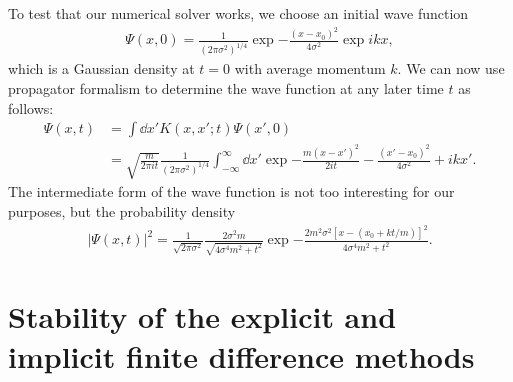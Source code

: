 To test that our numerical solver works, we choose an initial wave function
\begin{align}
    \Psi(x,0) = \frac{1}{(2 \pi \sigma^2)^{1/4}} \exp{-\frac{(x - x_{0})^2}{4 \sigma^2}} \exp{i k x}
,\end{align}
which is a Gaussian density at $t = 0$ with average momentum $k$.
We can now use propagator formalism to determine the wave function at any later time $t$ as follows:
\begin{align}
    \Psi(x,t) &= \int \dd{x'} K(x,x';t) \Psi(x',0) \nonumber \\
              &= \sqrt{\frac{m}{2 \pi i t}} \frac{1}{(2 \pi \sigma^2)^{1/4}} \int_{-\infty}^{\infty} \dd{x'} \exp{-\frac{m(x - x')^2}{2 i t} - \frac{(x' - x_0)^2}{4 \sigma^2} + i k x'}
.\end{align}
The intermediate form of the wave function is not too interesting for our purposes, but the probability density
\begin{align}
    |\Psi(x,t)|^2 = \frac{1}{\sqrt{2 \pi \sigma^2}} \frac{2 \sigma^2 m}{\sqrt{ 4 \sigma^4 m^2 + t^2 }} \exp{ -\frac{2 m^2 \sigma^2 [ x - (x_0 + k t / m) ]^2}{4 \sigma^{4} m^2 + t^2} }
.\end{align}

\appendix

\section{Stability of the explicit and implicit finite difference methods}
\label{app:stability-of-the-explicity-and-implicit-finite-difference-methods}

